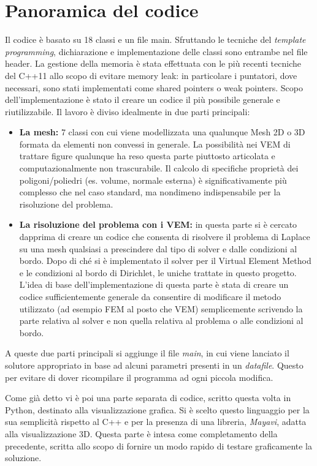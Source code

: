 \documentclass[oneside,12pt]{book}  %
\theoremstyle{plain}
\theoremstyle{definition}
\theoremstyle{remark}
\numberwithin{equation}{chapter} %
\begin{document}
\section{Panoramica del codice}
\label{sec:panoramica}
Il codice \`e basato su 18 classi e un file main. Sfruttando le
tecniche del \textit{template programming}, dichiarazione e
implementazione delle classi sono entrambe nel file header.
La gestione della memoria \`e stata effettuata con le pi\`u recenti
tecniche del C++11 allo scopo di evitare memory leak: in particolare i puntatori,
dove necessari, sono stati implementati come shared pointers o weak
pointers.
Scopo dell'implementazione \`e stato il creare un codice il pi\`u
possibile generale e riutilizzabile. 
Il lavoro \`e diviso idealmente in due parti principali:
\begin{itemize}
\item
\textbf{La mesh:} 7 classi con cui viene modellizzata una qualunque
Mesh 2D o 3D formata da elementi non convessi in generale. La
possibilit\`a nei VEM di trattare figure qualunque ha
reso questa parte piuttosto articolata e computazionalmente non
trascurabile. Il calcolo di specifiche propriet\`a dei
poligoni/poliedri (es. volume, normale esterna) \`e significativamente
pi\`u complesso che nel caso standard, ma nondimeno indispensabile per
la risoluzione del problema.

\item
\textbf{La risoluzione del problema con i VEM:} in questa parte si \`e
cercato dapprima di creare un codice che consenta di risolvere il
problema di Laplace su una mesh qualsiasi a prescindere dal tipo di
solver e dalle condizioni al bordo. Dopo di ch\'e si \`e implementato
il solver per il Virtual Element Method e le condizioni al bordo di
Dirichlet, le uniche trattate in questo progetto.
L'idea di base dell'implementazione di questa parte \`e stata di
creare un codice sufficientemente generale da consentire di modificare
il metodo utilizzato (ad esempio FEM al posto che VEM) semplicemente
scrivendo la parte relativa al solver e non quella relativa al
problema o alle condizioni al bordo.
\end{itemize}
A queste due parti principali si aggiunge il file \textit{main}, in
cui viene lanciato il solutore appropriato in base ad alcuni parametri
presenti in un \textit{datafile}. Questo per evitare di dover
ricompilare il programma ad ogni piccola modifica.

Come gi\`a detto vi \`e poi una parte separata di codice, scritto questa
volta in Python, destinato alla visualizzazione grafica. Si \`e scelto
questo linguaggio per la sua semplicit\`a rispetto al C++ e per la
presenza di una libreria, \textit{Mayavi}, adatta alla visualizzazione
3D. Questa parte \`e intesa come completamento della precedente,
scritta allo scopo di fornire un modo rapido di testare graficamente
la soluzione.
\end{document}
